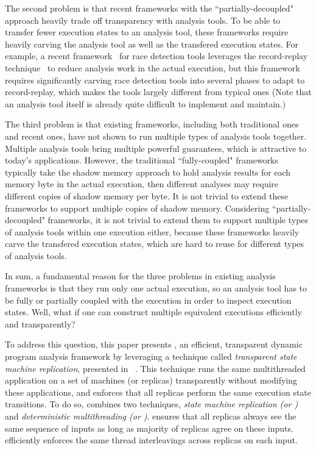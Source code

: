 The second problem is that recent frameworks with the ``partially-decoupled"
approach heavily trade off transparency with analysis tools. To be able to
transfer fewer execution states to an analysis tool, these frameworks require
heavily carving the analysis tool as well as the transfered execution states.
For example, a recent framework~\cite{wester:parallelizing:asplos13} for race
detection tools leverages the record-replay
technique~\cite{scribe:sigmetrics2010, respec:asplos10, racepro:sosp11} to
reduce analysis work in the actual execution, but this framework
requires significantly carving race detection tools into several phases to adapt
to record-replay, which makes the tools largely different from typical ones
(Note that an analysis tool itself is already quite difficult to implement and
maintain.)


The third problem is that existing frameworks, including both traditional ones
and recent ones, have not shown to run multiple types of analysis tools 
together. Multiple analysis tools bring multiple powerful
guarantees, which is attractive to today's applications. However, the
traditional ``fully-coupled" frameworks typically take the shadow memory 
approach to hold analysis results for each memory byte in the actual execution, 
then different analyses may require different copies of shadow memory per byte. 
It is not trivial to extend these frameworks to support multiple copies of 
shadow memory. Considering ``partially-decoupled" frameworks, it is not trivial 
to extend them to support multiple types of analysis tools within one execution 
either, because these frameworks heavily carve the transfered execution states, 
which are hard to reuse for different types of analysis tools.


In sum, a fundamental reason for the three problems in existing analysis 
frameworks is that they run only one actual execution, so an analysis tool has
to be fully or partially coupled with the execution in order to inspect
execution states. Well, what if one can construct multiple equivalent
executions efficiently and transparently?




To address this question, this paper presents \xxx, an efficient, 
transparent dynamic program analysis framework by leveraging a technique called 
\emph{transparent state machine replication}, presented in 
\repbox~\cite{repbox:sosp15}. This technique runs the same multithreaded 
application on a set of machines (or replicas) transparently without modifying 
these applications, and enforces that all replicas
perform the same execution state transitions. To do so, \repbox combines two techniques, 
 \emph{state machine replication (or 
\smr)} and \emph{deterministic multithreading (or \dmt)}.  \smr ensures that all replicas
always see the same sequence of inputs as long as majority of replicas agree on these inputs. 
 \dmt efficiently enforces the same thread interleavings across replicas on each input.



